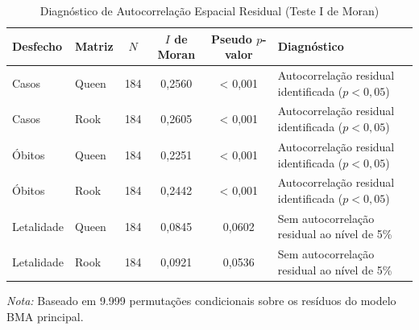 \begin{table}[htbp]
\centering
\small
\caption{Diagnóstico de Autocorrelação Espacial Residual (Teste I de Moran)}
\label{tab:diagnostico_espacial}
\begin{tabular}{llcccp{5.5cm}}
\toprule
\textbf{Desfecho} & \textbf{Matriz} & \textbf{$N$} & \textbf{$I$ de Moran} & \textbf{Pseudo $p$-valor} & \textbf{Diagnóstico} \\
\midrule
Casos & Queen & 184 & 0,2560 & < 0,001 & Autocorrelação residual identificada ($p < 0{,}05$) \\
Casos & Rook & 184 & 0,2605 & < 0,001 & Autocorrelação residual identificada ($p < 0{,}05$) \\
Óbitos & Queen & 184 & 0,2251 & < 0,001 & Autocorrelação residual identificada ($p < 0{,}05$) \\
Óbitos & Rook & 184 & 0,2442 & < 0,001 & Autocorrelação residual identificada ($p < 0{,}05$) \\
Letalidade & Queen & 184 & 0,0845 & 0,0602 & Sem autocorrelação residual ao nível de 5\% \\
Letalidade & Rook & 184 & 0,0921 & 0,0536 & Sem autocorrelação residual ao nível de 5\% \\
\bottomrule
\end{tabular}
\begin{tablenotes}\footnotesize
\item \textit{Nota:} Baseado em 9.999 permutações condicionais sobre os resíduos do modelo BMA principal.
\end{tablenotes}
\end{table}